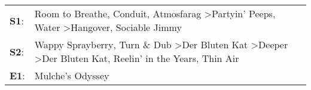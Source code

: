 \begin{supertabular}{p{0.03\textwidth}p{0.92\textwidth}}
 \textbf{S1}:  &                              Room to Breathe\textsuperscript{}, \enspace Conduit\textsuperscript{}, \enspace Atmosfarag\textsuperscript{} \textgreater \enspace Partyin' Peeps\textsuperscript{}, \enspace Water\textsuperscript{} \textgreater \enspace Hangover\textsuperscript{}, \enspace Sociable Jimmy\textsuperscript{}  \enspace  \\
 \textbf{S2}:  &  Wappy Sprayberry\textsuperscript{}, \enspace Turn \& Dub\textsuperscript{} \textgreater \enspace Der Bluten Kat\textsuperscript{} \textgreater \enspace Deeper\textsuperscript{} \textgreater \enspace Der Bluten Kat\textsuperscript{}, \enspace Reelin' in the Years\textsuperscript{}, \enspace Thin Air\textsuperscript{}  \enspace  \\
 \textbf{E1}:  &                                                                                                                                                                                                                                                                                             Mulche's Odyssey\textsuperscript{}  \enspace  \\
\end{supertabular}
